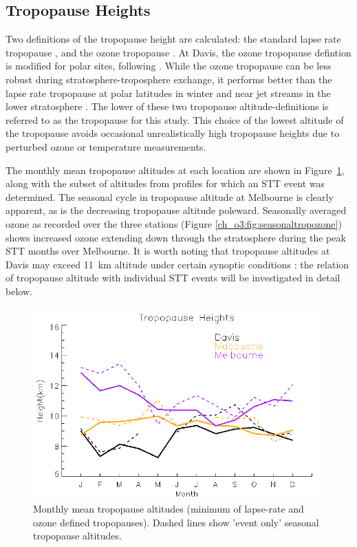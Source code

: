   \subsection{Tropopause Heights}
    Two definitions of the tropopause height are calculated: the standard lapse rate tropopause \citep{WMO1957}, and the ozone tropopause \citep{Bethan1996}.
    At Davis, the ozone tropopause defintion is modified for polar sites, following \citet{Tomikawa2009,Alexander2013}. 
    While the ozone tropopause can be less robust during stratosphere-troposphere exchange, it performs better than the lapse rate tropopause at polar latitudes in winter and near jet streams in the lower stratosphere \citep{Bethan1996}. The lower of these two tropopause altitude-definitions is referred to as the tropopause for this study.
    This choice of the lowest altitude of the tropopause avoids occasional unrealistically high tropopause heights due to perturbed ozone or temperature measurements.

    The monthly mean tropopause altitudes at each location are shown in Figure~\ref{ch_o3:fig:seasonaltpheights}, along with the subset of altitudes from profiles for which an STT event was determined. 
    The seasonal cycle in tropopause altitude at Melbourne is clearly apparent, as is the decreasing tropopause altitude poleward. 
    Seasonally averaged ozone as recorded over the three stations (Figure \ref{ch_o3:fig:seasonaltropozone}) shows increased ozone extending down through the stratosphere during the peak STT months over Melbourne.
    It is worth noting that tropopause altitudes at Davis may exceed 11~km altitude under certain synoptic conditions \citep{Alexander2013}: the relation of tropopause altitude with individual STT events will be investigated in detail below.

    \begin{figure}\begin{center}
      \includegraphics[width=0.8\columnwidth]{Figures/Ozone/tpheights.png}
      \caption{
	Monthly mean tropopause altitudes (minimum of lapse-rate and ozone defined tropopauses). Dashed lines show 'event only' seasonal tropopause altitudes.%
      }
      \label{ch_o3:fig:seasonaltpheights}
    \end{center}\end{figure}

